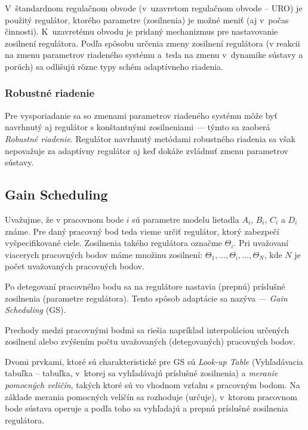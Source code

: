 \documentclass[a4paper, 10pt, ]{article}
\begin{document}
V~štandardnom regulačnom obvode (v~uzavretom regulačnom obvode -- URO) je použitý regulátor, ktorého parametre (zosilnenia) je možné meniť (aj v~počas činnosti). K~uzavretému obvodu je pridaný mechanizmus pre nastavovanie zosilnení regulátora. Podľa spôsobu určenia zmeny zosilnení regulátora (v reakcii na zmenu parametrov riadeného systému a~teda na zmenu v~dynamike sústavy a porúch) sa odlišujú rôzne typy schém adaptívneho riadenia.

\subsubsection{Robustné riadenie}

Pre vysporiadanie sa so zmenami parametrov riadeného systému môže byť navrhnutý aj regulátor s konštantnými zosilneniami --- týmto sa zaoberá \emph{Robustné riadenie}. Regulátor navrhnutý metódami robustného riadenia sa však nepovažuje za adaptívny regulátor aj keď dokáže zvládnuť zmenu parametrov sústavy.



\subsection{Gain Scheduling}

Uvažujme, že v pracovnom bode $i$ sú parametre modelu lietadla $A_i$, $B_i$, $C_i$ a $D_i$ známe. Pre daný pracovný bod teda vieme určiť regulátor, ktorý zabezpečí vyšpecifikované ciele. Zosilnenia takého regulátora označme $\Theta_i$. Pri uvažovaní viacerych pracovných bodov máme množinu zosilnení: $\Theta_1,\ldots, \Theta_i,\ldots, \Theta_N$, kde $N$ je počet uvažovaných pracovných bodov.

Po detegovaní pracovného bodu sa na regulátore nastavia (prepnú) príslušné zosilnenia (parametre regulátora). Tento spôsob adaptácie sa nazýva  --- \emph{Gain Scheduling} (GS).

Prechody medzi pracovnými bodmi sa riešia napríklad interpoláciou určených zosilnení alebo zvýšením počtu uvažovaných (detegovaných) pracovných bodov.

Dvomi prvkami, ktoré sú charakteristické pre GS sú \emph{Look-up Table} (Vyhľadávacia tabuľka -- tabuľka, v~ktorej sa vyhľadávajú príslušné zosilnenia) a \emph{meranie pomocných veličín}, takých ktoré sú vo vhodnom vzťahu s pracovným bodom. Na základe merania pomocných veličín sa rozhoduje (určuje), v~ktorom pracovnom bode sústava operuje a podľa toho sa vyhľadajú a prepnú príslušné zosilnenia regulátora.
\end{document}
